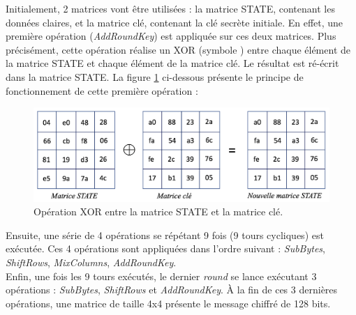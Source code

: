 \documentclass[10pt, oneside, a4paper]{article}
\begin{document}
Initialement, 2 matrices vont être utilisées : la matrice STATE, contenant les données claires, et la matrice clé, contenant la clé secrète initiale. En effet, une première opération (\textit{AddRoundKey}) est appliquée sur ces deux matrices. Plus précisément, cette opération réalise un XOR (symbole \oplus) entre chaque élément de la matrice STATE et chaque élément de la matrice clé. Le résultat est ré-écrit dans la matrice STATE. La figure \ref{fig:XOR} ci-dessous présente le principe de fonctionnement de cette première opération :
\begin{figure}[htbp]
    \centering
    \includegraphics[scale=0.65]{image/XOR}
    \caption{Opération XOR entre la matrice STATE et la matrice clé.}
    \label{fig:XOR}
\end{figure}

\vspace{-0.5 cm}\hspace{-0.5 cm}Ensuite, une série de 4 opérations se répétant 9 fois (9 tours cycliques) est exécutée. Ces 4 opérations sont appliquées dans l'ordre suivant : \textit{SubBytes}, \textit{ShiftRows}, \textit{MixColumns}, \textit{AddRoundKey}. \\
Enfin, une fois les 9 tours exécutés, le dernier \textit{round} se lance exécutant 3 opérations : \textit{SubBytes}, \textit{ShiftRows} et \textit{AddRoundKey}. À la fin de ces 3 dernières opérations, une matrice de taille 4x4 présente le message chiffré de 128 bits.
\end{document}
